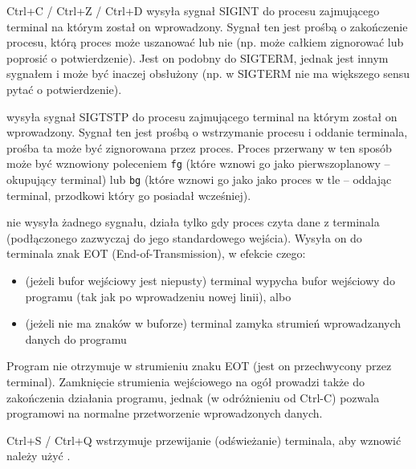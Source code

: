 \begin{ProTip}[breakable]{Ctrl+C / Ctrl+Z / Ctrl+D}
 wysyła sygnał SIGINT do procesu zajmującego terminal na którym został on wprowadzony. Sygnał ten jest prośbą o zakończenie procesu, którą proces może uszanować lub nie (np. może całkiem zignorować lub poprosić o potwierdzenie). Jest on podobny do SIGTERM, jednak jest innym sygnałem i może być inaczej obsłużony (np. w SIGTERM nie ma większego sensu pytać o potwierdzenie).

\vspace{6pt} wysyła sygnał SIGTSTP do procesu zajmującego terminal na którym został on wprowadzony. Sygnał ten jest prośbą o wstrzymanie procesu i oddanie terminala, prośba ta może być zignorowana przez proces. Proces przerwany w ten sposób może być wznowiony poleceniem \Verb#fg# (które wznowi go jako pierwszoplanowy – okupujący terminal) lub \Verb#bg# (które wznowi go jako jako proces w tle – oddając terminal, przodkowi który go posiadał wcześniej).

\vspace{6pt} nie wysyła żadnego sygnału, działa tylko gdy proces czyta dane z terminala (podłączonego zazwyczaj do jego standardowego wejścia). Wysyła on do terminala znak EOT (End-of-Transmission), w efekcie czego:
\begin{itemize}
	\item (jeżeli bufor wejściowy jest niepusty) terminal wypycha bufor wejściowy do programu (tak jak po wprowadzeniu nowej linii), albo
	\item (jeżeli nie ma znaków w buforze) terminal zamyka strumień wprowadzanych danych do programu
\end{itemize}
Program nie otrzymuje w strumieniu znaku EOT (jest on przechwycony przez terminal).
Zamknięcie strumienia wejściowego na ogół prowadzi także do zakończenia działania programu, jednak (w odróżnieniu od Ctrl-C) pozwala programowi na normalne przetworzenie wprowadzonych danych.
\end{ProTip}

\begin{ProTip}[breakable]{Ctrl+S / Ctrl+Q}
 wstrzymuje przewijanie (odświeżanie) terminala, aby wznowić należy użyć .
\end{ProTip}

